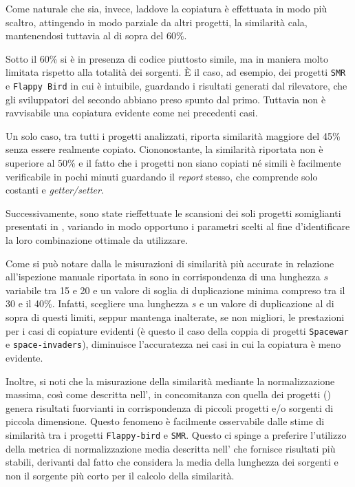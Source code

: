 Come naturale che sia, invece, laddove la copiatura è effettuata in modo più scaltro, attingendo in modo parziale da altri progetti, la similarità cala, mantenendosi tuttavia al di sopra del 60\%.

Sotto il 60\% si è in presenza di codice piuttosto simile, ma in maniera molto limitata rispetto alla totalità dei sorgenti.
%
\`E il caso, ad esempio, dei progetti \texttt{SMR} e \texttt{Flappy Bird} in cui è intuibile, guardando i risultati generati dal rilevatore, che gli sviluppatori del secondo abbiano preso spunto dal primo.
%
Tuttavia non è ravvisabile una copiatura evidente come nei precedenti casi.

Un solo caso, tra tutti i progetti analizzati, riporta similarità maggiore del 45\% senza essere realmente copiato.
%
Ciononostante, la similarità riportata non è superiore al 50\% e il fatto che i progetti non siano copiati né simili è facilmente verificabile in pochi minuti guardando il \textit{report} stesso, che comprende solo costanti e \textit{getter/setter}.

Successivamente, sono state rieffettuate le scansioni dei soli progetti somiglianti presentati in , variando in modo opportuno i parametri scelti al fine d'identificare la loro combinazione ottimale da utilizzare.

Come si può notare dalla  le misurazioni di similarità più accurate in relazione all'ispezione manuale riportata in  sono in corrispondenza di una lunghezza $s$ variabile tra 15 e 20 e un valore di soglia di duplicazione minima compreso tra il 30 e il 40\%.
%
Infatti, scegliere una lunghezza $s$ e un valore di duplicazione al di sopra di questi limiti, seppur mantenga inalterate, se non migliori, le prestazioni per i casi di copiature evidenti (è questo il caso della coppia di progetti \texttt{Spacewar} e \texttt{space-invaders}), diminuisce l'accuratezza nei casi in cui la copiatura è meno evidente.

Inoltre, si noti che la misurazione della similarità mediante la normalizzazione massima, così come descritta nell', in concomitanza con quella dei progetti () genera risultati fuorvianti in corrispondenza di piccoli progetti e/o sorgenti di piccola dimensione.
%
Questo fenomeno è facilmente osservabile dalle stime di similarità tra i progetti \texttt{Flappy-bird} e \texttt{SMR}. 
%
Questo ci spinge a preferire l'utilizzo della metrica di normalizzazione media descritta nell' che fornisce risultati più stabili, derivanti dal fatto che considera la media della lunghezza dei sorgenti e non il sorgente più corto per il calcolo della similarità.

